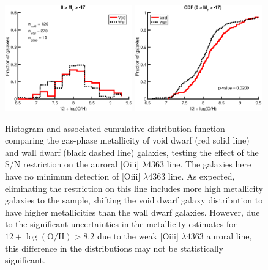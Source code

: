 \begin{figure}
    \centering
    \includegraphics[width=0.49\textwidth]{Images/Paper1/0sig_dwarf_SF_t3_12logOH_hist}
    \includegraphics[width=0.49\textwidth]{Images/Paper1/0sig_dwarf_SF_t3_12logOH_CDF}
    \caption[{Metallicity distribution with no restriction on [] 
    $\lambda 4363$}]{Histogram and associated cumulative distribution function 
    comparing the gas-phase metallicity of void dwarf (red solid line) and wall 
    dwarf (black dashed line) galaxies, testing the effect of the S/N 
    restriction on the auroral [O{\sc iii}] $\lambda 4363$ line.  The galaxies 
    here have no minimum detection of [O{\sc iii}] $\lambda 4363$ line.  As 
    expected, eliminating the restriction on this line includes more high 
    metallicity galaxies to the sample, shifting the void dwarf galaxy 
    distribution to have higher metallicities than the wall dwarf galaxies.  
    However, due to the significant uncertainties in the metallicity estimates 
    for $12 + \log (\text{O}/\text{H}) > 8.2$ due to the weak [O{\sc iii}] 
    $\lambda 4363$ auroral line, this difference in the distributions may not be 
    statistically significant.}
	\label{fig:met0sig}
\end{figure}

